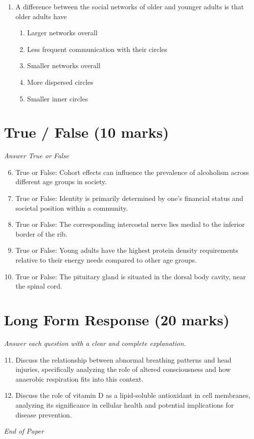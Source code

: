 \documentclass[12pt]{article}
\begin{document}
\begin{enumerate}[label=\arabic*.]
\begin{enumerate}[label=(\alph*)]
    \item Alpha-L-iduronidase
    \item Arylsulfatase A
    \item Hexosaminidase B
    \item Glucose-6-phosphatase
    \item Lysosomal alpha-glucosidase
\end{enumerate}
\item A difference between the social networks of older and younger adults is that older adults have
\begin{enumerate}[label=(\alph*)]
    \item Larger networks overall
    \item Less frequent communication with their circles
    \item Smaller networks overall
    \item More dispersed circles
    \item Smaller inner circles
\end{enumerate}
\end{enumerate}

\section*{True / False (10 marks)}
\textit{Answer True or False}
\begin{enumerate}[label=\arabic*.]
\setcounter{enumi}{5}
\item True or False: Cohort effects can influence the prevalence of alcoholism across different age groups in society.
\item True or False: Identity is primarily determined by one's financial status and societal position within a community.
\item True or False: The corresponding intercostal nerve lies medial to the inferior border of the rib.
\item True or False: Young adults have the highest protein density requirements relative to their energy needs compared to other age groups.
\item True or False: The pituitary gland is situated in the dorsal body cavity, near the spinal cord.
\end{enumerate}

\section*{Long Form Response (20 marks)}
\textit{Answer each question with a clear and complete explanation.}
\begin{enumerate}[label=\arabic*.]
\setcounter{enumi}{10}
\item Discuss the relationship between abnormal breathing patterns and head injuries, specifically analyzing the role of altered consciousness and how anaerobic respiration fits into this context.
\item Discuss the role of vitamin D as a lipid-soluble antioxidant in cell membranes, analyzing its significance in cellular health and potential implications for disease prevention.
\end{enumerate}

\vfill
\noindent\textit{End of Paper}
\end{document}
